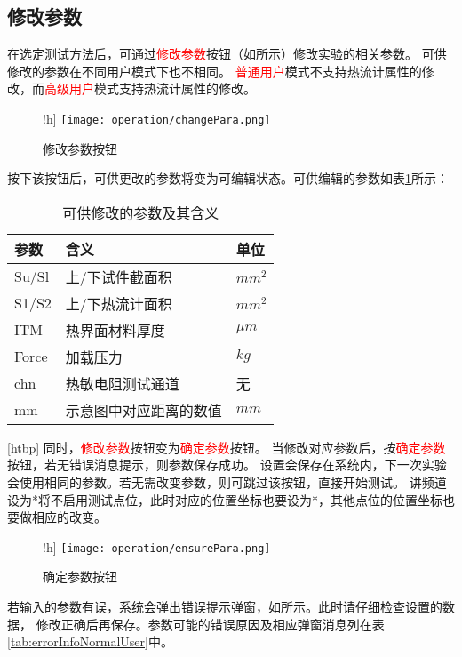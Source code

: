 \subsection{修改参数}
在选定测试方法后，可通过\textcolor{red}{修改参数}按钮（如所示）修改实验的相关参数。
可供修改的参数在不同用户模式下也不相同。
\textcolor{red}{普通用户}模式不支持热流计属性的修改，而\textcolor{red}{高级用户}模式支持热流计属性的修改。
\begin{figure}!h]
    \centering
    \texttt{[image: operation/changePara.png]}
    \caption{ 修改参数按钮 \label{fig:btnChangePara}}
\end{figure}
按下该按钮后，可供更改的参数将变为可编辑状态。可供编辑的参数如表\ref{tab:editableParaNormalUser}所示：
\begin{table}
    \centering
    \caption{ 可供修改的参数及其含义 \label{tab:editableParaNormalUser}}
    \begin{tabular}{@{}lll@{}}
        \toprule
        参数  & 含义                   & 单位    \\ \midrule
        Su/Sl & 上/下试件截面积        & $mm^2$  \\
        S1/S2 & 上/下热流计面积        & $mm^2$  \\
        ITM   & 热界面材料厚度         & $\mu m$ \\
        Force & 加载压力               & $kg$    \\
        chn   & 热敏电阻测试通道       & 无      \\
        mm    & 示意图中对应距离的数值 & $mm$    \\ \bottomrule
    \end{tabular}
\end{table}[htbp]
同时，\textcolor{red}{修改参数}按钮变为\textcolor{red}{确定参数}按钮。
当修改对应参数后，按\textcolor{red}{确定参数}按钮，若无错误消息提示，则参数保存成功。
设置会保存在系统内，下一次实验会使用相同的参数。若无需改变参数，则可跳过该按钮，直接开始测试。
讲频道设为*将不启用测试点位，此时对应的位置坐标也要设为*，其他点位的位置坐标也要做相应的改变。
\begin{figure}!h]
    \centering
    \texttt{[image: operation/ensurePara.png]}
    \caption{ 确定参数按钮 \label{fig:ensurePara}}
\end{figure}

\begin{note}
    若输入的参数有误，系统会弹出错误提示弹窗，如所示。此时请仔细检查设置的数据，
    修改正确后再保存。参数可能的错误原因及相应弹窗消息列在表\ref{tab:errorInfoNormalUser}中。
\end{note}

